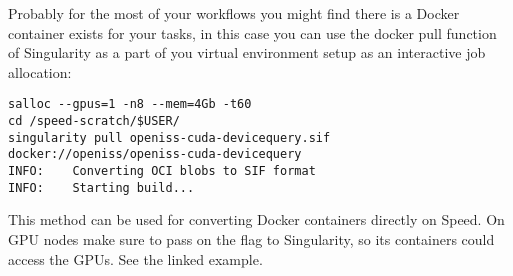 Probably for the most of your workflows you might find there is a
Docker container exists for your tasks, in this case you
can use the docker pull function of Singularity as a part
of you virtual environment setup as an interactive job
allocation:

\small
\begin{verbatim}
salloc --gpus=1 -n8 --mem=4Gb -t60
cd /speed-scratch/$USER/
singularity pull openiss-cuda-devicequery.sif docker://openiss/openiss-cuda-devicequery
INFO:    Converting OCI blobs to SIF format
INFO:    Starting build...
\end{verbatim}
\normalsize

\noindent
This method can be used for converting Docker containers directly on Speed.
On GPU nodes make sure to pass on the  flag to Singularity,
so its containers could access the GPUs. See the linked example.
